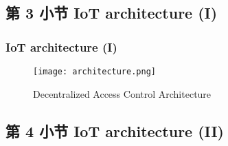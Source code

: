 \documentclass[
    aspectratio=169,                   %
]{beamer}
\begin{document}
\subsection{第 3 小节 IoT architecture (I)}

    \begin{frame}
        \frametitle{IoT architecture (I)}

            \begin{figure}
                \centering
                \begin{stampbox}
                    \texttt{[image: architecture.png]}
                \end{stampbox}
                \caption{Decentralized Access Control Architecture\cite{novo}}
            \end{figure}

        
    \end{frame}

\subsection{第 4 小节 IoT architecture (II)}
\end{document}
